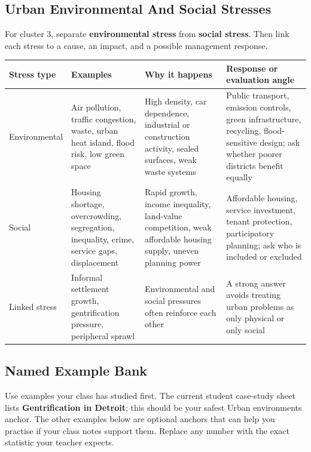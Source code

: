 \documentclass[11pt,a4paper]{article}
\newcommand{\term}[1]{\textcolor{HeadingBlue}{\textbf{#1}}}
\begin{document}
\subsection{Urban Environmental And Social Stresses}

For cluster 3, separate \term{environmental stress} from \term{social stress}.
Then link each stress to a cause, an impact, and a possible management response.

\begin{tabularx}{\textwidth}{L{0.19\textwidth}Y Y Y}
\toprule
\textbf{Stress type} & \textbf{Examples} & \textbf{Why it happens} & \textbf{Response or evaluation angle} \\
\midrule
Environmental & Air pollution, traffic congestion, waste, urban heat island,
flood risk, low green space & High density, car dependence, industrial or
construction activity, sealed surfaces, weak waste systems & Public transport,
emission controls, green infrastructure, recycling, flood-sensitive design; ask
whether poorer districts benefit equally \\
Social & Housing shortage, overcrowding, segregation, inequality, crime,
service gaps, displacement & Rapid growth, income inequality, land-value
competition, weak affordable housing supply, uneven planning power & Affordable
housing, service investment, tenant protection, participatory planning; ask who
is included or excluded \\
Linked stress & Informal settlement growth, gentrification pressure,
peripheral sprawl & Environmental and social pressures often reinforce each
other & A strong answer avoids treating urban problems as only physical or only
social \\
\bottomrule
\end{tabularx}

\subsection{Named Example Bank}

Use examples your class has studied first. The current student case-study sheet
lists \term{Gentrification in Detroit}; this should be your safest Urban
environments anchor. The other examples below are optional anchors that can
help you practise if your class notes support them. Replace any number with the
exact statistic your teacher expects.
\end{document}
